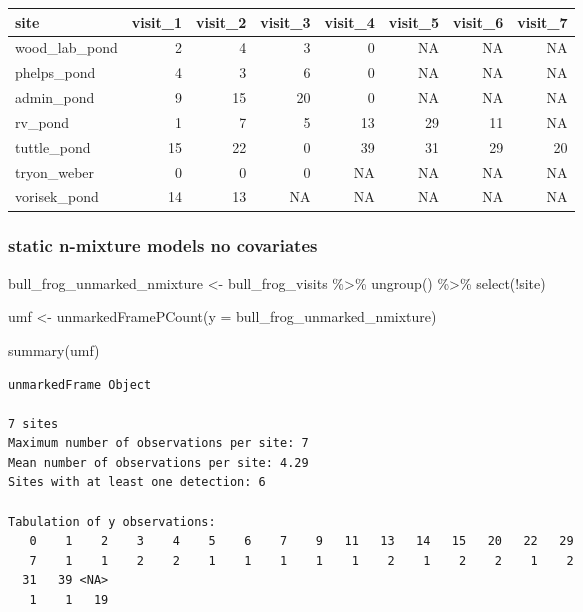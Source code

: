 \documentclass[
  letterpaper,
  DIV=11,
  numbers=noendperiod]{scrartcl}
\newenvironment{Shaded}{\begin{snugshade}}{\end{snugshade}}
\newcommand{\AttributeTok}[1]{\textcolor[rgb]{0.40,0.45,0.13}{#1}}
\newcommand{\FunctionTok}[1]{\textcolor[rgb]{0.28,0.35,0.67}{#1}}
\newcommand{\NormalTok}[1]{\textcolor[rgb]{0.00,0.23,0.31}{#1}}
\newcommand{\OtherTok}[1]{\textcolor[rgb]{0.00,0.23,0.31}{#1}}
\newcommand{\SpecialCharTok}[1]{\textcolor[rgb]{0.37,0.37,0.37}{#1}}
\begin{document}
\begin{tabular}{l|r|r|r|r|r|r|r}
\hline
site & visit\_1 & visit\_2 & visit\_3 & visit\_4 & visit\_5 & visit\_6 & visit\_7\\
\hline
wood\_lab\_pond & 2 & 4 & 3 & 0 & NA & NA & NA\\
\hline
phelps\_pond & 4 & 3 & 6 & 0 & NA & NA & NA\\
\hline
admin\_pond & 9 & 15 & 20 & 0 & NA & NA & NA\\
\hline
rv\_pond & 1 & 7 & 5 & 13 & 29 & 11 & NA\\
\hline
tuttle\_pond & 15 & 22 & 0 & 39 & 31 & 29 & 20\\
\hline
tryon\_weber & 0 & 0 & 0 & NA & NA & NA & NA\\
\hline
vorisek\_pond & 14 & 13 & NA & NA & NA & NA & NA\\
\hline
\end{tabular}

\hypertarget{static-n-mixture-models-no-covariates}{%
\subsubsection{static n-mixture models no
covariates}\label{static-n-mixture-models-no-covariates}}

\begin{Shaded}
\begin{Highlighting}[]
\NormalTok{bull\_frog\_unmarked\_nmixture }\OtherTok{\textless{}{-}}\NormalTok{ bull\_frog\_visits }\SpecialCharTok{\%\textgreater{}\%} 
  \FunctionTok{ungroup}\NormalTok{() }\SpecialCharTok{\%\textgreater{}\%} 
  \FunctionTok{select}\NormalTok{(}\SpecialCharTok{!}\NormalTok{site)}


\NormalTok{umf }\OtherTok{\textless{}{-}} \FunctionTok{unmarkedFramePCount}\NormalTok{(}\AttributeTok{y =}\NormalTok{ bull\_frog\_unmarked\_nmixture)}

\FunctionTok{summary}\NormalTok{(umf)}
\end{Highlighting}
\end{Shaded}

\begin{verbatim}
unmarkedFrame Object

7 sites
Maximum number of observations per site: 7 
Mean number of observations per site: 4.29 
Sites with at least one detection: 6 

Tabulation of y observations:
   0    1    2    3    4    5    6    7    9   11   13   14   15   20   22   29 
   7    1    1    2    2    1    1    1    1    1    2    1    2    2    1    2 
  31   39 <NA> 
   1    1   19 
\end{verbatim}
\end{document}
